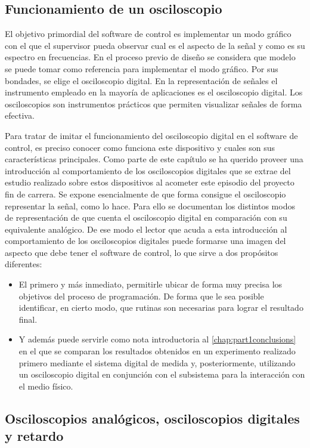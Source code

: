 \subsection{Funcionamiento de un osciloscopio}

El objetivo primordial del software de control es implementar un modo gráfico con el que el supervisor pueda observar cual es el aspecto de la señal y como es su espectro en frecuencias. En el proceso previo de diseño se considera que modelo se puede tomar como referencia para implementar el modo gráfico. Por sus bondades, se elige el osciloscopio digital. En la representación de señales el instrumento empleado en la mayoría de aplicaciones es el osciloscopio digital. Los osciloscopios son instrumentos prácticos que permiten visualizar señales de forma efectiva.\par
Para tratar de imitar el funcionamiento del osciloscopio digital en el software de control, es preciso conocer como funciona este dispositivo y cuales son sus características principales. Como parte de este capítulo se ha querido proveer una introducción al comportamiento de los osciloscopios digitales que se extrae del estudio realizado sobre estos dispositivos al acometer este episodio del proyecto fin de carrera. Se expone esencialmente de que forma consigue el osciloscopio representar la señal, como lo hace. Para ello se documentan los distintos modos de representación de que cuenta el osciloscopio digital en comparación con su equivalente analógico. De ese modo el lector que acuda a esta introducción al comportamiento de los osciloscopios digitales puede formarse una imagen del aspecto que debe tener el software de control, lo que sirve a dos propósitos diferentes:

\begin{itemize}
	\item El primero y más inmediato, permitirle ubicar de forma muy precisa los objetivos del proceso de programación. De forma que le sea posible identificar, en cierto modo, que rutinas son necesarias para lograr el resultado final.
	\item Y además puede servirle como nota introductoria al \cref{chap:part1conclusions} en el que se comparan los resultados obtenidos en un experimento realizado primero mediante el sistema digital de medida y, posteriormente, utilizando un osciloscopio digital en conjunción con el subsistema para la interacción con el medio físico.
\end{itemize}


\subsection{Osciloscopios analógicos, osciloscopios digitales y retardo}

